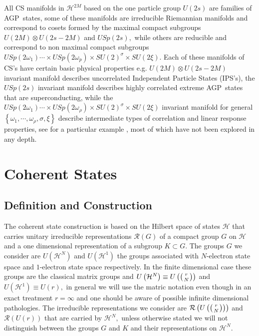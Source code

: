\documentclass[aps,preprint]{revtex4}%
\begin{document}
All CS manifolds in $\mathcal{H}^{2M}$ based on the one particle group
$U\left(  2s\right)  $ are families of AGP\ states, some of these manifolds
are irreducible Riemannian manifolds and correspond to cosets formed by the
maximal compact subgroups $U\left(  2M\right)  \otimes U\left(  2s-2M\right)
$ and $USp\left(  2s\right)  ,$ while others are reducible and correspond to
non maximal compact subgroups $USp\left(  2\omega_{1}\right)  \cdots\times
USp\left(  2\omega_{p}\right)  \times SU\left(  2\right)  ^{\sigma}\times
SU\left(  2\xi\right)  $. Each of these manifolds of CS's have certain basic
physical properties e.g. $U\left(  2M\right)  \otimes U\left(  2s-2M\right)  $
invariant manifold describes uncorrelated Independent Particle States (IPS's),
the $USp\left(  2s\right)  $ invariant manifold describes highly correlated
extreme AGP\ states that are superconducting, while the $USp\left(
2\omega_{1}\right)  \cdots\times USp\left(  2\omega_{\rho}\right)  \times
SU\left(  2\right)  ^{\sigma}\times SU\left(  2\xi\right)  $ invariant
manifold for general $\left\{  \omega_{1},\cdots,\omega_{\rho},\sigma
,\xi\right\}  $ describe intermediate types of correlation and linear response
properties, see for a particular example \cite{oscillstrength}, most of which
have not been explored in any depth.

\section{Coherent States\label{cohstate}}

\subsection{Definition and Construction\label{def}}

The coherent state construction is based on the Hilbert space of states
$\mathcal{H}$ that carries unitary irreducible representations $\mathcal{R}%
\left(  G\right)  $ of a compact group $G$ on $\mathcal{H}$ and a one
dimensional representation of a subgroup $K\subset G$. The groups $G$ we
consider are $U\left(  \mathcal{H}^{N}\right)  $ and $U\left(  \mathcal{H}%
^{1}\right)  $ the groups associated with $N$-electron state space and
$1$-electron state space respectively. In the finite dimensional case these
groups are the classical matrix groups and $U\left(  \mathcal{H}^{N}\right)
\equiv U\left(  \left(
\genfrac{}{}{0pt}{}{r}{N}%
\right)  \right)  $ and $U\left(  \mathcal{H}^{1}\right)  \equiv U\left(
r\right)  ,$ in general we will use the matric notation even though in an
exact treatment $r=\infty$ and one should be aware of possible infinite
dimensional pathologies. The irreducible representations we consider are
$\mathcal{R}\left(  U\left(  \left(
\genfrac{}{}{0pt}{}{r}{N}%
\right)  \right)  \right)  $ and $\mathcal{R}\left(  U\left(  r\right)
\right)  $ that are carried by $\mathcal{H}^{N},$ unless otherwise stated we
will not distinguish between the groups $G$ and $K$ and their representations
on $\mathcal{H}^{N}$.
\end{document}
